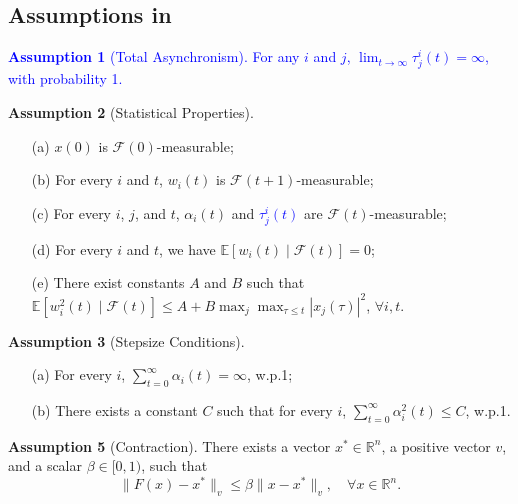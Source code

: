 \subsection{Assumptions in \cite{tsitsiklis1994asynchronous}}

\noindent
\textcolor{blue}{\textbf{Assumption 1} (Total Asynchronism).
For any $i$ and $j$, $\lim_{t \to \infty} \tau_j^i(t) = \infty$, with probability 1.}

\vspace{1em}

\noindent
\textbf{Assumption 2} (Statistical Properties).
\begin{enumerate}
\item[(a)] $x(0)$ is $\mathcal{F}(0)$-measurable;
\item[(b)] For every $i$ and $t$, $w_i(t)$ is $\mathcal{F}(t+1)$-measurable;
\item[(c)] For every $i$, $j$, and $t$, $\alpha_i(t)$ and \textcolor{blue}{$\tau_j^i(t)$} are $\mathcal{F}(t)$-measurable;
\item[(d)] For every $i$ and $t$, we have $\mathbb{E}[w_i(t) \mid \mathcal{F}(t)] = 0$;
\item[(e)] There exist constants $A$ and $B$ such that
$\mathbb{E}[w_i^2(t) \mid \mathcal{F}(t)] \leq A + B \max_j \max_{\tau \leq t} |x_j(\tau)|^2$, $\forall i, t$.
\end{enumerate}

\vspace{1em}

\noindent
\textbf{Assumption 3} (Stepsize Conditions).
\begin{enumerate}
\item[(a)] For every $i$, $\sum_{t=0}^{\infty} \alpha_i(t) = \infty$, w.p.1;
\item[(b)] There exists a constant $C$ such that for every $i$, $\sum_{t=0}^{\infty} \alpha_i^2(t) \leq C$, w.p.1.
\end{enumerate}

\vspace{1em}

\noindent
\textbf{Assumption 5} (Contraction).
There exists a vector $x^* \in \mathbb{R}^n$, a positive vector $v$, and a scalar $\beta \in [0,1)$, such that
\begin{equation}
\|F(x) - x^*\|_v \leq \beta \|x - x^*\|_v, \quad \forall x \in \mathbb{R}^n.
\end{equation}

\vspace{1em}

